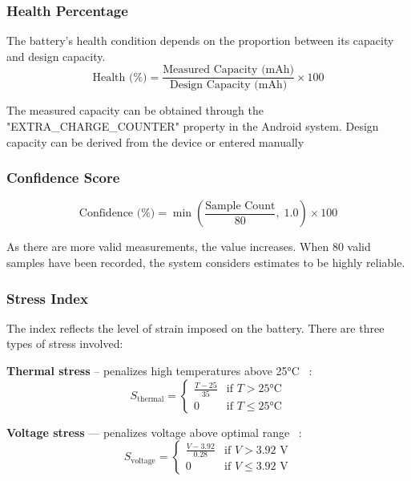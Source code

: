 \documentclass[12pt,a4paper]{report}
\begin{document}
\subsubsection{Health Percentage}

The battery's health condition depends on the proportion between its capacity and design capacity.
\begin{equation}
  \text{Health (\%)} = \frac{\text{Measured Capacity (mAh)}}{\text{Design Capacity (mAh)}} \times 100
\end{equation}

The measured capacity can be obtained through the "EXTRA\_CHARGE\_COUNTER"
property in the Android system. Design capacity can be derived from the device
or entered manually
\subsubsection{Confidence Score}

\begin{equation}
  \text{Confidence (\%)} = \min\!\left(\frac{\text{Sample Count}}{80},\; 1.0\right) \times 100
\end{equation}

As there are more valid measurements, the value increases. When 80 valid samples have been recorded, the system considers estimates to be highly reliable.

\subsubsection{Stress Index}

The index reflects the level of strain imposed on the battery. There are three types of stress involved:

\textbf{Thermal stress} – penalizes high temperatures above 25°C \cite{BU808}~:
\begin{equation}
  S_{\text{thermal}} =
  \begin{cases}
    \frac{T - 25}{35} & \text{if } T > 25\text{°C}\\
    0                 & \text{if } T \leq 25\text{°C}
  \end{cases}
\end{equation}

\textbf{Voltage stress} — penalizes voltage above optimal range \cite{AccuBattery}~:
\begin{equation}
  S_{\text{voltage}} =
  \begin{cases}
    \frac{V - 3.92}{0.28} & \text{if } V > 3.92\text{ V}\\
    0                     & \text{if } V \leq 3.92\text{ V}
  \end{cases}
\end{equation}
\end{document}
